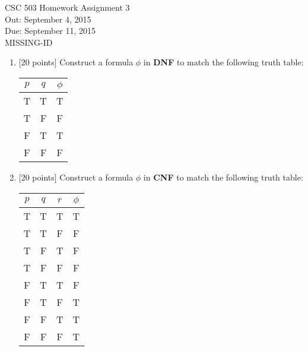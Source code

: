\documentclass{article}
\def\unityid{MISSING-ID}
\begin{document}
\begin{center}
  {\LARGE CSC 503 Homework Assignment 3}\\[1pc]
  Out: September 4, 2015 \\
  Due: September 11, 2015 \\
  \unityid
\end{center}

\begin{enumerate}

\item {[20 points]} Construct a formula $\phi$ in \textbf{DNF} to
  match the following truth table:
  \begin{center}
    \begin{tabular}{cc|c}
      $p$ & $q$ & $\phi$ \\ \hline
      T & T & T \\
      T & F & F \\
      F & T & T \\
      F & F & F
    \end{tabular}
  \end{center}

\item {[20 points]} Construct a formula $\phi$ in \textbf{CNF} to
  match the following truth table:
  \begin{center}
    \begin{tabular}{ccc|c}
      $p$ & $q$ & $r$ & $\phi$ \\ \hline
      T & T & T & T\\
      T & T & F & F\\
      T & F & T & F\\
      T & F & F & F\\
      F & T & T & F\\
      F & T & F & T\\
      F & F & T & T\\
      F & F & F & T
    \end{tabular}
  \end{center}
  

\end{enumerate}
\end{document}
